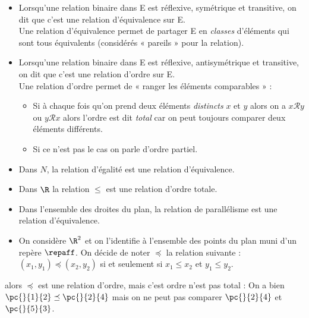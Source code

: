 \begin{definition}
    \begin{itemize}
        \item 	Lorsqu'une relation binaire dans E est réflexive, symétrique et transitive, on dit que c'est une relation d'équivalence sur E.\\
              Une relation d'équivalence permet de partager E en \textit{classes} d'éléments qui sont tous équivalents (considérés « pareils »  pour la relation).
        \item 	Lorsqu'une relation binaire dans E est réflexive, antisymétrique et transitive, on dit que c'est une relation d'ordre sur E.\\
              Une relation d'ordre permet de « ranger les éléments comparables  »  :
              \begin{itemize}
                  \item 	Si à chaque fois qu'on prend deux éléments \textit{distincts} $x$ et $y$ alors on a $x\mathcal{R}y$ ou $y\mathcal{R}x$ alors l'ordre est dit \textit{total} car on peut toujours comparer deux éléments différents.
                  \item 	Si ce n'est pas le cas on parle d'ordre partiel.
              \end{itemize}
    \end{itemize}
\end{definition}

\begin{exemple}[s]
    \begin{itemize}
        \item 	Dans $N$, la relation d'égalité est une relation d'équivalence.
        \item 	Dans $\R$ la relation $\leqslant$ est une relation d'ordre totale.
        \item 	Dans l'ensemble des droites du plan, la relation de parallélisme est une relation d'équivalence.
        \item 	On considère $\R^2$ et on l'identifie à l'ensemble des points du plan muni d'un repère $\repaff$.
              On décide de noter $\preceq$ la relation suivante :\\ $(x_1,y_1)\preceq(x_2,y_2)$ si et seulement si $x_1\leqslant x_2$ et $y_1\leqslant y_2$.
              \begin{center}
              \end{center}
    \end{itemize}
    alors $\preceq$ est une relation d'ordre, mais c'est ordre n'est pas total  : On a bien $\pc{}{1}{2}\preceq\pc{}{2}{4}$ mais on ne peut pas comparer $\pc{}{2}{4}$ et $\pc{}{5}{3}$.
\end{exemple}

